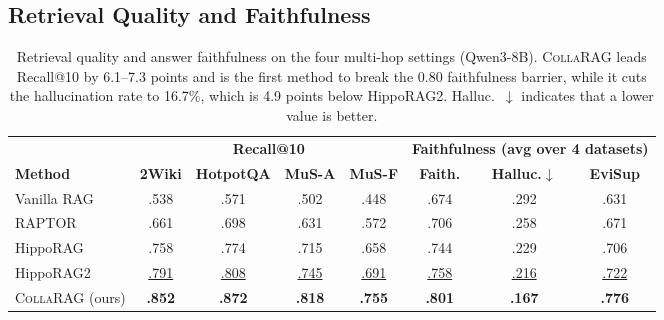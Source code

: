 \documentclass[11pt,a4paper]{article}
\newcommand{\sys}{\textsc{CollaRAG}}
\newcommand{\best}[1]{\textbf{#1}}
\newcommand{\second}[1]{\underline{#1}}
\begin{document}
\subsection{Retrieval Quality and Faithfulness}
\label{sec:analysis:retrieval}

\begin{table}[t]
\centering
\small
\setlength{\tabcolsep}{5pt}
\begin{tabular}{@{}l|cccc|ccc@{}}
\toprule
& \multicolumn{4}{c|}{\textbf{Recall@10}} & \multicolumn{3}{c}{\textbf{Faithfulness (avg over 4 datasets)}} \\
\textbf{Method} & \textbf{2Wiki} & \textbf{HotpotQA} & \textbf{MuS-A} & \textbf{MuS-F} & \textbf{Faith.} & \textbf{Halluc.}$\downarrow$ & \textbf{EviSup} \\
\midrule
Vanilla RAG  & .538 & .571 & .502 & .448 & .674 & .292 & .631 \\
RAPTOR       & .661 & .698 & .631 & .572 & .706 & .258 & .671 \\
HippoRAG     & .758 & .774 & .715 & .658 & .744 & .229 & .706 \\
HippoRAG2    & \second{.791} & \second{.808} & \second{.745} & \second{.691} & \second{.758} & \second{.216} & \second{.722} \\
\sys{} (ours)& \best{.852} & \best{.872} & \best{.818} & \best{.755} & \best{.801} & \best{.167} & \best{.776} \\
\bottomrule
\end{tabular}
\caption{Retrieval quality and answer faithfulness on the four multi-hop settings (Qwen3-8B). \sys{} leads Recall@10 by 6.1--7.3 points and is the first method to break the 0.80 faithfulness barrier, while it cuts the hallucination rate to 16.7\%, which is 4.9 points below HippoRAG2. Halluc.~$\downarrow$ indicates that a lower value is better.}
\label{tab:retrieval}
\end{table}
\end{document}
